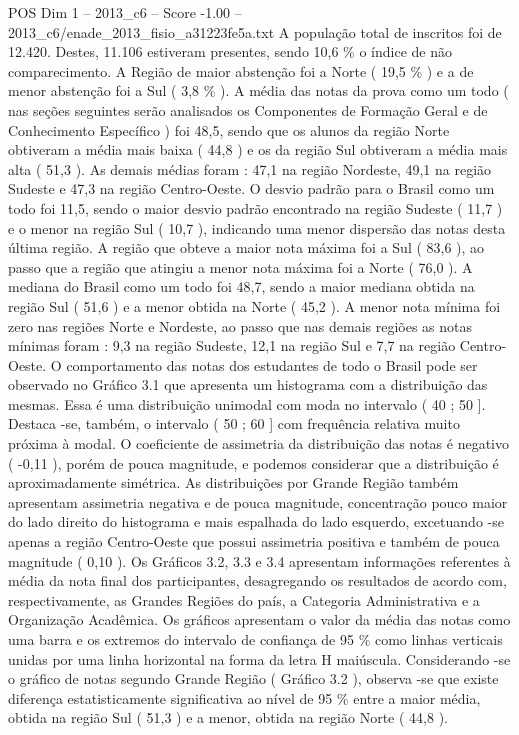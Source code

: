 \begin{textsample}{POS Dim 1 – 2013\_c6 – Score -1.00 – 2013\_c6/enade\_2013\_fisio\_a31223fe5a.txt}
A população total de inscritos foi de 12.420.
Destes, 11.106 estiveram presentes, sendo 10,6 \% o índice de não comparecimento.
A Região de maior abstenção foi a Norte ( 19,5 \% ) e a de menor abstenção foi a Sul ( 3,8 \% ).
A média das notas da prova como um todo ( nas seções seguintes serão analisados os Componentes de Formação Geral e de Conhecimento Específico ) foi 48,5, sendo que os alunos da região Norte obtiveram a média mais baixa ( 44,8 ) e os da região Sul obtiveram a média mais alta ( 51,3 ).
As demais médias foram : 47,1 na região Nordeste, 49,1 na região Sudeste e 47,3 na região Centro-Oeste.
O desvio padrão para o Brasil como um todo foi 11,5, sendo o maior desvio padrão encontrado na região Sudeste ( 11,7 ) e o menor na região Sul ( 10,7 ), indicando uma menor dispersão das notas desta última região.
A região que obteve a maior nota máxima foi a Sul ( 83,6 ), ao passo que a região que atingiu a menor nota máxima foi a Norte ( 76,0 ).
A mediana do Brasil como um todo foi 48,7, sendo a maior mediana obtida na região Sul ( 51,6 ) e a menor obtida na Norte ( 45,2 ).
A menor nota mínima foi zero nas regiões Norte e Nordeste, ao passo que nas demais regiões as notas mínimas foram : 9,3 na região Sudeste, 12,1 na região Sul e 7,7 na região Centro-Oeste.
O comportamento das notas dos estudantes de todo o Brasil pode ser observado no Gráfico 3.1 que apresenta um histograma com a distribuição das mesmas.
Essa é uma distribuição unimodal com moda no intervalo ( 40 ; 50 ].
Destaca -se, também, o intervalo ( 50 ; 60 ] com frequência relativa muito próxima à modal.
O coeficiente de assimetria da distribuição das notas é negativo ( -0,11 ), porém de pouca magnitude, e podemos considerar que a distribuição é aproximadamente simétrica.
As distribuições por Grande Região também apresentam assimetria negativa e de pouca magnitude, concentração pouco maior do lado direito do histograma e mais espalhada do lado esquerdo, excetuando -se apenas a região Centro-Oeste que possui assimetria positiva e também de pouca magnitude ( 0,10 ).
Os Gráficos 3.2, 3.3 e 3.4 apresentam informações referentes à média da nota final dos participantes, desagregando os resultados de acordo com, respectivamente, as Grandes Regiões do país, a Categoria Administrativa e a Organização Acadêmica.
Os gráficos apresentam o valor da média das notas como uma barra e os extremos do intervalo de confiança de 95 \% como linhas verticais unidas por uma linha horizontal na forma da letra H maiúscula.
Considerando -se o gráfico de notas segundo Grande Região ( Gráfico 3.2 ), observa -se que existe diferença estatisticamente significativa ao nível de 95 \% entre a maior média, obtida na região Sul ( 51,3 ) e a menor, obtida na região Norte ( 44,8 ).

\end{textsample}
